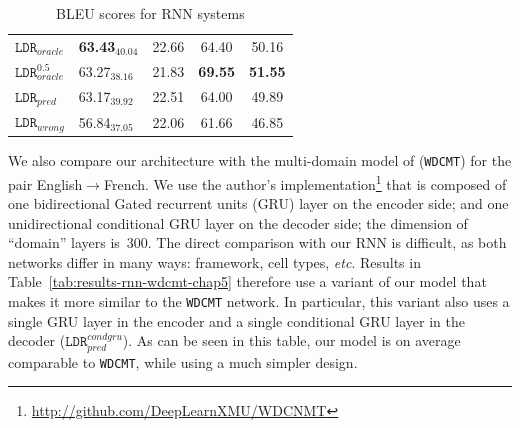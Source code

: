 \begin{table}[!h]
\begin{center}
{\begin{tabular}{|l|lcc|c|}
\hline
$\mathtt{LDR}_{oracle}$     & \bf 63.43$_{40.04}$ & 22.66 & 64.40 & 50.16\\
$\mathtt{LDR}_{oracle}^{0.5}$   & 63.27$_{38.16}$ & 21.83 & \bf 69.55 & \bf 51.55\\
$\mathtt{LDR}_{pred}$        & 63.17$_{39.92}$ & 22.51 & 64.00 & 49.89\\
$\mathtt{LDR}_{wrong}$     & 56.84$_{37.05}$ & 22.06 & 61.66 & 46.85\\
\hline
\end{tabular}
} %
\end{center}
\caption{BLEU scores for RNN systems\label{tab:results-rnn-chap5}}
\end{table}

We also compare our architecture with the multi-domain model of \citet{Zeng18multidomain} (\texttt{WDCMT}) for the pair English$\rightarrow$French. We use the author's implementation\footnote{\noindent\url{http://github.com/DeepLearnXMU/WDCNMT}} that is composed of one bidirectional Gated recurrent units (GRU) layer on the encoder side; and one unidirectional conditional GRU layer on the decoder side; the dimension of ``domain'' layers is~300.
%
The direct comparison with our RNN is difficult, as both networks differ in many ways: framework, cell types, \textit{etc}. Results in Table~\ref{tab:results-rnn-wdcmt-chap5} therefore use a variant of our model that makes it more similar to the \texttt{WDCMT} network. In particular, this variant also uses a single GRU layer in the encoder and a single conditional GRU layer in the decoder ($\mathtt{LDR}_{pred}^{condgru}$). As can be seen in this table, our model is on average comparable to \texttt{WDCMT}, while using a much simpler design.

\begin{table}[!h]
\begin{center}
\end{center}
\caption{BLEU scores for RNN systems. Comparison between \texttt{WDCMT} and $\texttt{LDR}_{pred}$ built using conditional GRUs.\label{tab:results-rnn-wdcmt-chap5}}
\end{table}

